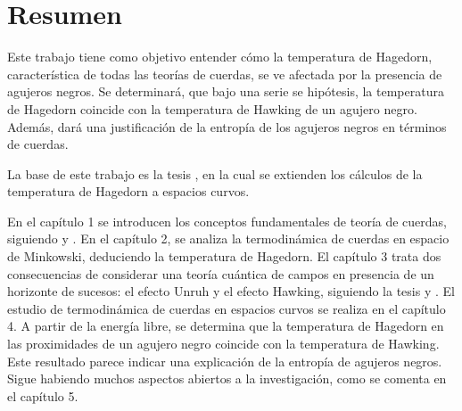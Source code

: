 \chapter*{Resumen}

Este trabajo tiene como objetivo entender cómo la temperatura de Hagedorn, 
característica de todas las teorías de cuerdas, se ve afectada por la presencia de agujeros
negros.
Se determinará, que bajo una serie se hipótesis, la temperatura de Hagedorn coincide con la
temperatura de Hawking de un agujero negro.
Además, dará una justificación de la entropía de los agujeros negros en términos de cuerdas.

La base de este trabajo es la tesis \cite{Mertens2015}, en la cual se extienden los cálculos 
de la temperatura de Hagedorn a espacios curvos.

En el capítulo 1 se introducen los conceptos fundamentales de teoría de cuerdas, siguiendo \cite{Tong:2009np} y \cite{Mertens2015}. 
En el capítulo 2, se analiza la termodinámica de cuerdas en espacio de Minkowski, deduciendo la temperatura de Hagedorn.
El capítulo 3 trata dos consecuencias de considerar una teoría cuántica de campos 
en presencia de un horizonte de sucesos:  el efecto Unruh y el efecto Hawking, siguiendo la tesis \cite{Barbado:2015uua} y \cite{Susskind}.
El estudio de termodinámica de cuerdas en espacios curvos se realiza en el capítulo 4.
A partir de la energía libre, se determina que la temperatura de Hagedorn en las proximidades
de un agujero negro coincide con la temperatura de Hawking.
Este resultado parece indicar una explicación de la entropía de agujeros negros.
Sigue habiendo muchos aspectos abiertos a la investigación, como se comenta en el capítulo 5.
